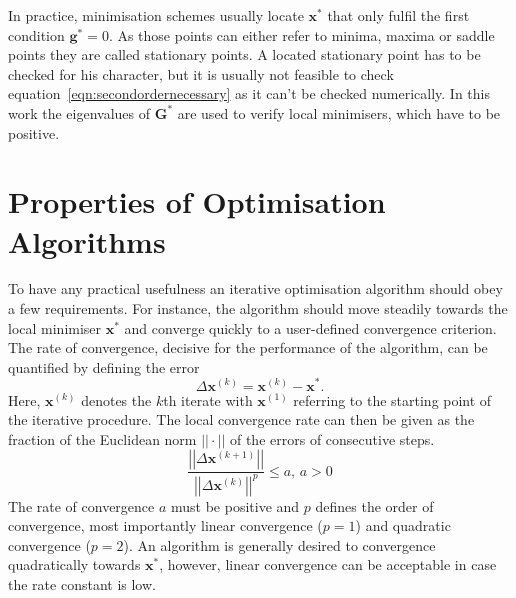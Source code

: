 In practice, minimisation schemes usually locate $\mathbf{x^*}$ that only
fulfil the first condition $\mathbf{g^*}=0$. As those points can
either refer to minima, maxima or saddle points they are called stationary
points. A located stationary point has to be checked for his character, but it
is usually not feasible to check equation~\eqref{eqn:secondordernecessary} as
it can't be checked numerically. In this work the eigenvalues of
$\mathbf{G^*}$ are used to verify local minimisers, which have to be
positive.

\section{Properties of Optimisation Algorithms}
\label{sec:PropertiesOfOptimisationAlgorithms}

To have any practical usefulness an iterative optimisation algorithm should
obey a few requirements. For instance, the algorithm should move steadily
towards the local minimiser $\mathbf{x^*}$ and converge quickly to a
user-defined convergence criterion. The rate of convergence, decisive for the
performance of the algorithm, can be quantified by defining the error
%
\begin{equation}
    \Delta\mathbf{x}^{(k)}=\mathbf{x}^{(k)}-\mathbf{x^*}.
\end{equation}
%
Here, $\mathbf{x}^{(k)}$ denotes the $k$th iterate with $\mathbf{x}^{(1)}$
referring to the starting point of the iterative procedure. The local
convergence rate can then be given as the fraction of the Euclidean norm
$||\cdot||$ of the errors of consecutive steps.
%
\begin{equation}
    \frac{\left|\left|\Delta\mathbf{x}^{(k+1)}\right|\right|}{\left|\left|\Delta\mathbf{x}^{(k)}\right|\right|^{p}}\leq a, \,a>0
\end{equation}
%
The rate of convergence $a$ must be positive and $p$ defines the order of
convergence, most importantly linear convergence ($p=1$) and quadratic
convergence ($p=2$). An algorithm is generally desired to convergence
quadratically towards $\mathbf{x^*}$, however, linear convergence can be
acceptable in case the rate constant is low.

